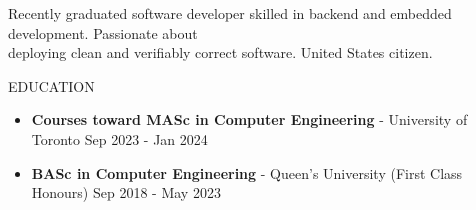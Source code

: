 \documentclass{resume} %
\begin{document}
Recently graduated software developer skilled in backend and embedded development. Passionate about\\
deploying clean and verifiably correct software. United States citizen.

\begin{rSection}{EDUCATION}
    \begin{itemize}
        \item {\bf Courses toward MASc in Computer Engineering} - University of Toronto \hfill {Sep 2023 - Jan 2024}
    \end{itemize}
    \begin{itemize}
        \item {\bf BASc in Computer Engineering} - Queen's University (First Class Honours) \hfill {Sep 2018 - May 2023}
    \end{itemize}
\end{rSection}
\end{document}
